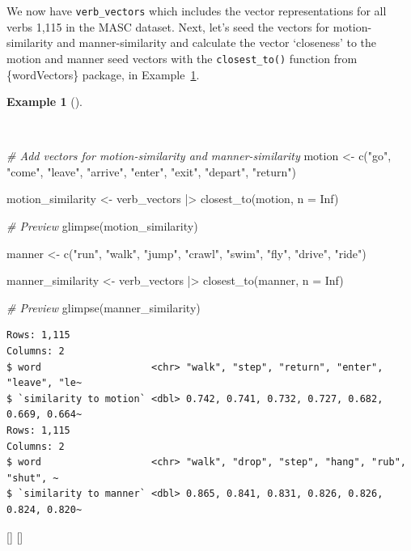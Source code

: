 \documentclass[
  letterpaper,
  krantz1]{latex/krantz-mod}
\newenvironment{Shaded}{\begin{snugshade}}{\end{snugshade}}
\newcommand{\AttributeTok}[1]{\textcolor[rgb]{0.00,0.00,0.00}{#1}}
\newcommand{\CommentTok}[1]{\textcolor[rgb]{0.00,0.00,0.00}{\textit{#1}}}
\newcommand{\ConstantTok}[1]{\textcolor[rgb]{0.00,0.00,0.00}{#1}}
\newcommand{\FunctionTok}[1]{\textcolor[rgb]{0.00,0.00,0.00}{#1}}
\newcommand{\NormalTok}[1]{\textcolor[rgb]{0.00,0.00,0.00}{#1}}
\newcommand{\OtherTok}[1]{\textcolor[rgb]{0.00,0.00,0.00}{#1}}
\newcommand{\SpecialCharTok}[1]{\textcolor[rgb]{0.00,0.00,0.00}{#1}}
\newcommand{\StringTok}[1]{\textcolor[rgb]{0.00,0.00,0.00}{#1}}
\newcommand{\cindex}[1]{%
  \StrSubstitute{#1}{_}{\_}[\temp]%
  \index{\temp}%
}
\theoremstyle{definition}
\theoremstyle{definition}
\newtheorem{example}{Example}[chapter]
\theoremstyle{remark}
\begin{document}
We now have \texttt{verb\_vectors} which includes the vector
representations for all verbs 1,115 in the MASC dataset. Next, let's
seed the vectors for motion-similarity and manner-similarity and
calculate the vector `closeness' to the motion and manner seed vectors
with the \texttt{closest\_to()} function from \{wordVectors\} package,
in Example~\ref{exm-explore-masc-vsm-word2vec-manner-motion}.

\pagebreak

\begin{example}[]\protect\hypertarget{exm-explore-masc-vsm-word2vec-manner-motion}{}\label{exm-explore-masc-vsm-word2vec-manner-motion}

~

\begin{Shaded}
\begin{Highlighting}[numbers=left,,]
\CommentTok{\# Add vectors for motion{-}similarity and manner{-}similarity}
\NormalTok{motion }\OtherTok{\textless{}{-}}
  \FunctionTok{c}\NormalTok{(}\StringTok{"go"}\NormalTok{, }\StringTok{"come"}\NormalTok{, }\StringTok{"leave"}\NormalTok{, }\StringTok{"arrive"}\NormalTok{, }\StringTok{"enter"}\NormalTok{, }\StringTok{"exit"}\NormalTok{, }\StringTok{"depart"}\NormalTok{, }\StringTok{"return"}\NormalTok{)}

\NormalTok{motion\_similarity }\OtherTok{\textless{}{-}}
\NormalTok{  verb\_vectors }\SpecialCharTok{|\textgreater{}} \FunctionTok{closest\_to}\NormalTok{(motion, }\AttributeTok{n =} \ConstantTok{Inf}\NormalTok{)}

\CommentTok{\# Preview}
\FunctionTok{glimpse}\NormalTok{(motion\_similarity)}

\NormalTok{manner }\OtherTok{\textless{}{-}}
  \FunctionTok{c}\NormalTok{(}\StringTok{"run"}\NormalTok{, }\StringTok{"walk"}\NormalTok{, }\StringTok{"jump"}\NormalTok{, }\StringTok{"crawl"}\NormalTok{, }\StringTok{"swim"}\NormalTok{, }\StringTok{"fly"}\NormalTok{, }\StringTok{"drive"}\NormalTok{, }\StringTok{"ride"}\NormalTok{)}

\NormalTok{manner\_similarity }\OtherTok{\textless{}{-}}
\NormalTok{  verb\_vectors }\SpecialCharTok{|\textgreater{}} \FunctionTok{closest\_to}\NormalTok{(manner, }\AttributeTok{n =} \ConstantTok{Inf}\NormalTok{)}

\CommentTok{\# Preview}
\FunctionTok{glimpse}\NormalTok{(manner\_similarity)}
\end{Highlighting}
\end{Shaded}

\begin{verbatim}
Rows: 1,115
Columns: 2
$ word                   <chr> "walk", "step", "return", "enter", "leave", "le~
$ `similarity to motion` <dbl> 0.742, 0.741, 0.732, 0.727, 0.682, 0.669, 0.664~
Rows: 1,115
Columns: 2
$ word                   <chr> "walk", "drop", "step", "hang", "rub", "shut", ~
$ `similarity to manner` <dbl> 0.865, 0.841, 0.831, 0.826, 0.826, 0.824, 0.820~
\end{verbatim}

 \cindex{closest_to()}\cindex{glimpse()}

\end{example}
\end{document}

